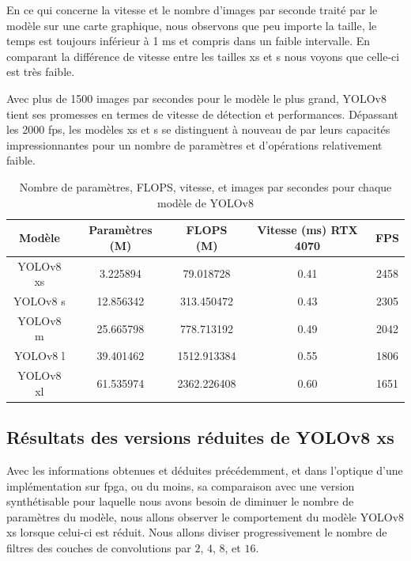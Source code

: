 En ce qui concerne la vitesse et le nombre d'images par seconde traité par le modèle sur une carte graphique, nous observons que peu importe la taille, le temps est toujours inférieur à 1 ms et compris dans un faible intervalle. En comparant la différence de vitesse entre les tailles xs et s nous voyons que celle-ci est très faible.

Avec plus de 1500 images par secondes pour le modèle le plus grand, YOLOv8 tient ses promesses en termes de vitesse de détection et performances. Dépassant les 2000 \acrshort{fps}, les modèles xs et s se distinguent à nouveau de par leurs capacités impressionnantes pour un nombre de paramètres et d'opérations relativement faible.

\begin{table}[!ht]
    \caption{Nombre de paramètres, FLOPS, vitesse, et images par secondes pour chaque modèle de YOLOv8}
    \label{tab:yolov8_flops_only_legit}
    \centering
    \begin{tabular}{ |c||c|c|c|c| }
        \hline
        \rowcolor{gray!50}
        Modèle & Paramètres (M) & FLOPS (M) & Vitesse (ms) RTX 4070 & FPS\\
        \hline
        YOLOv8 xs & 3.225894 & 79.018728 & 0.41 & 2458\\
        YOLOv8 s & 12.856342 & 313.450472 & 0.43 & 2305\\
        YOLOv8 m & 25.665798 & 778.713192 & 0.49 & 2042\\
        YOLOv8 l & 39.401462 & 1512.913384 & 0.55 & 1806\\
        YOLOv8 xl & 61.535974 & 2362.226408 & 0.60 & 1651\\
        \hline
    \end{tabular}
\end{table}

\subsection{Résultats des versions réduites de YOLOv8 xs}

Avec les informations obtenues et déduites précédemment, et dans l'optique d'une implémentation sur \acrshort{fpga}, ou du moins, sa comparaison avec une version synthétisable pour laquelle nous avons besoin de diminuer le nombre de paramètres du modèle, nous allons observer le comportement du modèle YOLOv8 xs lorsque celui-ci est réduit. Nous allons diviser progressivement le nombre de filtres des couches de convolutions par $2$, $4$, $8$, et $16$.

